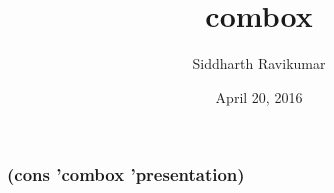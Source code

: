 \documentclass[14pt]{beamer}
\title{combox}
\author{Siddharth Ravikumar}
\institute{0x00B252AF}
\date{April 20, 2016}
\begin{document}
\begin{frame}
  \titlepage
\end{frame}



\begin{frame}
  \frametitle{(cons 'combox 'presentation)}
  \tableofcontents
\end{frame}














\end{document}
